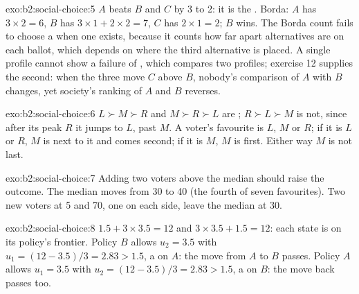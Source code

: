 \begin{solution}{exo:b2:social-choice:5}
$A$ beats $B$ and $C$ by 3 to 2: it is the . Borda: $A$ has $3 \times 2 = 6$, $B$ has $3 \times 1 + 2
\times 2 = 7$, $C$ has $2 \times 1 = 2$; $B$ wins. The Borda count fails to choose a  when one exists,
because it counts how far apart alternatives are on each ballot, which depends on where the third
alternative is placed. A single profile cannot show a failure of ,
which compares two profiles; exercise 12 supplies the second: when the three move $C$ above $B$, nobody's
comparison of $A$ with $B$ changes, yet society's ranking of $A$ and $B$ reverses.
\end{solution}

\begin{solution}{exo:b2:social-choice:6}
$L \succ M \succ R$ and $M \succ R \succ L$ are ; $R \succ L \succ M$ is not, since after its peak $R$ it jumps to
$L$, past $M$. A  voter's favourite is $L$, $M$ or $R$; if it is $L$ or $R$, $M$ is next to it and
comes second; if it is $M$, $M$ is first. Either way $M$ is not last.
\end{solution}

\begin{solution}{exo:b2:social-choice:7}
Adding two voters above the median should raise the outcome. The median moves from 30 to 40 (the fourth of seven
favourites). Two new voters at 5 and 70, one on each side, leave the median at 30.
\end{solution}

\begin{solution}{exo:b2:social-choice:8}
$1.5 + 3 \times 3.5 = 12$ and $3 \times 3.5 + 1.5 = 12$: each state is on its policy's frontier. Policy $B$ allows $u_2 =
3.5$ with $u_1 = (12 - 3.5)/3 = 2.83 > 1.5$, a  on $A$: the move from $A$ to $B$ passes. Policy $A$ allows
$u_1 = 3.5$ with $u_2 = (12 - 3.5)/3 = 2.83 > 1.5$, a  on $B$: the move back passes too.
\end{solution}

